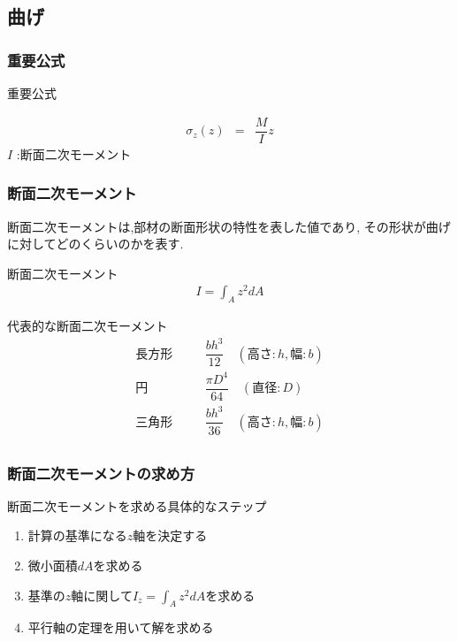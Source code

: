 \documentclass[a4paper]{jsarticle}
\begin{document}
\subsection{曲げ}
\subsubsection{重要公式}
\begin{itembox}[l]{重要公式}
    \begin{center}
        \begin{eqnarray*}
            \sigma_z\left(z\right)&=&\dfrac{M}{I}z
        \end{eqnarray*}
        $I$ :断面二次モーメント
    \end{center}
\end{itembox}
\subsubsection{断面二次モーメント}
断面二次モーメントは,部材の断面形状の特性を表した値であり,
その形状が曲げに対してどのくらいのかを表す.
\begin{itembox}[l]{断面二次モーメント}
    \begin{eqnarray*}
        \displaystyle I=\int_Az^2dA
    \end{eqnarray*}
\end{itembox}
\begin{itembox}[l]{代表的な断面二次モーメント}
    \begin{eqnarray*}
        長方形\quad&&\dfrac{bh^3}{12}\quad(高さ:h,幅:b)\\
        円\qquad&&\dfrac{\pi D^4}{64}\quad(直径:D)\\
        三角形\quad&&\dfrac{bh^3}{36}\quad(高さ:h,幅:b)\\
    \end{eqnarray*}
\end{itembox}
\subsubsection{断面二次モーメントの求め方}
\begin{itembox}[l]{断面二次モーメントを求める具体的なステップ}
    \begin{enumerate}[(1)]
        \item 計算の基準になる$z$軸を決定する
        \item 微小面積$dA$を求める
        \item 基準の$z$軸に関して$I_z=\int_Az^2dA$を求める
        \item 平行軸の定理を用いて解を求める
    \end{enumerate}
\end{itembox}
\end{document}
